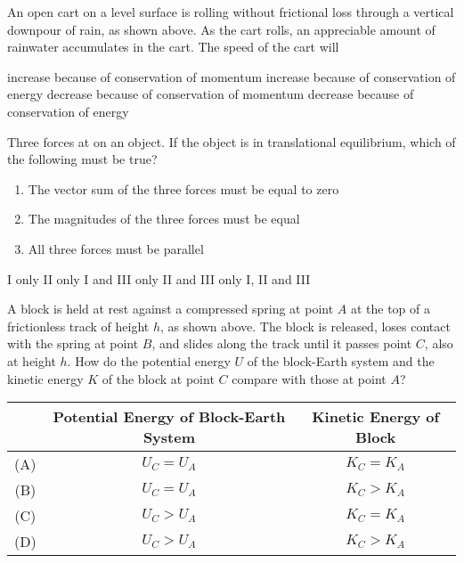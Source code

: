 \documentclass[12pt]{exam}
\newcommand{\pic}[2]{
  \begin{center}
    \texttt{[image: \#2]}
  \end{center}
}
\begin{document}
\begin{questions}
  \uplevel{
    \pic{.35}{downpour}
  }
  \question\vspace{-.2in}An open cart on a level surface is rolling without
  frictional loss through a vertical downpour of rain, as shown above. As the
  cart rolls, an appreciable amount of rainwater accumulates in the cart. The
  speed of the cart will
  \begin{choices}
    \choice increase because of conservation of momentum
    \choice increase because of conservation of energy
    \choice decrease because of conservation of momentum
    \choice decrease because of conservation of energy
  \end{choices}

  \question Three forces at on an object. If the object is in translational
  equilibrium, which of the following must be true?
  \begin{enumerate}[nosep,leftmargin=18pt,label={\Roman*.}]
  \item The vector sum of the three forces must be equal to zero
  \item The magnitudes of the three forces must be equal
  \item All three forces must be parallel
  \end{enumerate}
  \begin{choices}
    \choice I only
    \choice II only
    \choice I and III only
    \choice II and III only
    \choice I, II and III
  \end{choices}
  
  \uplevel{
    \pic{.5}{spring-block}
  }
  \question A block is held at rest against a compressed spring
  at point $A$ at the top of a frictionless track of height $h$, as shown
  above. The block is released, loses contact with the spring at point $B$, and
  slides along the track until it passes point $C$, also at height $h$. How do
  the potential energy $U$ of the block-Earth system and the kinetic energy $K$
  of the block at point $C$ compare with those at point $A$?
  
  \begin{tabular}{ccc}
    & Potential Energy of Block-Earth System & Kinetic Energy of Block\\
    \hline
    (A) & $U_C=U_A$ & $K_C=K_A$ \\
    (B) & $U_C=U_A$ & $K_C>K_A$ \\
    (C) & $U_C>U_A$ & $K_C=K_A$ \\
    (D) & $U_C>U_A$ & $K_C>K_A$
  \end{tabular}


\end{questions}
\end{document}
